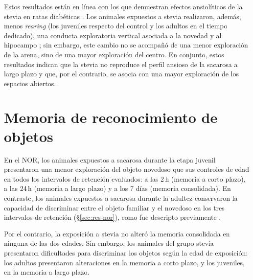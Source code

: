 Estos resultados están en línea con los que demuestran efectos ansiolíticos de la stevia en ratas diabéticas \cite{khakpai2023stevia}. Los animales expuestos a stevia realizaron, además, menos \textit{rearing} (los juveniles respecto del control y los adultos en el tiempo dedicado), una conducta exploratoria vertical asociada a la novedad y al hipocampo \cite{lever2006rearing}; sin embargo, este cambio no se acompañó de una menor exploración de la arena, sino de una mayor exploración del centro. En conjunto, estos resultados indican que la stevia no reproduce el perfil ansioso de la sacarosa a largo plazo y que, por el contrario, se asocia con una mayor exploración de los espacios abiertos.

\section{Memoria de reconocimiento de objetos}\label{sec:disc-nor}

En el NOR, los animales expuestos a sacarosa durante la etapa juvenil presentaron una menor exploración del objeto novedoso que sus controles de edad en todos los intervalos de retención evaluados: a las 2\,h (memoria a corto plazo), a las 24\,h (memoria a largo plazo) y a los 7 días (memoria consolidada). En contraste, los animales expuestos a sacarosa durante la adultez conservaron la capacidad de discriminar entre el objeto familiar y el novedoso en los tres intervalos de retención (\S\ref{sec:res-nor}), como fue descripto previamente \cite{coirini2022sucrose}.

Por el contrario, la exposición a stevia no alteró la memoria consolidada en ninguna de las dos edades. Sin embargo, los animales del grupo stevia presentaron dificultades para discriminar los objetos según la edad de exposición: los adultos presentaron alteraciones en la memoria a corto plazo, y los juveniles, en la memoria a largo plazo.


